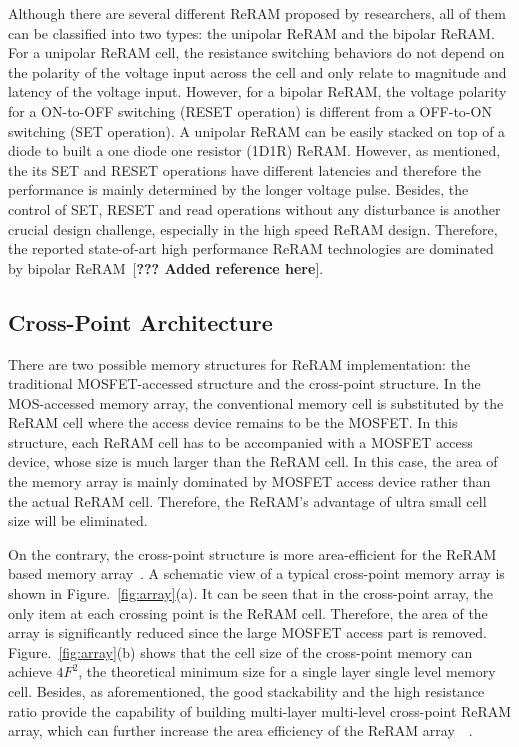 Although there are several different ReRAM proposed by researchers, all of them can be classified into two types: the unipolar ReRAM and the bipolar ReRAM. For a unipolar ReRAM cell, the resistance switching behaviors do not depend on the polarity of the voltage input across the cell and only relate to magnitude and latency of the voltage input. However, for a bipolar ReRAM, the voltage polarity for a ON-to-OFF switching (RESET operation) is different from a OFF-to-ON switching (SET operation). A unipolar ReRAM can be easily stacked on top of a diode to built a one diode one resistor (1D1R) ReRAM. However, as mentioned, the its SET and RESET operations have different latencies and therefore the performance is mainly determined by the longer voltage pulse. Besides, the control of SET, RESET and read operations without any disturbance is another crucial design challenge, especially in the high speed ReRAM design. Therefore, the reported state-of-art high performance ReRAM technologies are dominated by bipolar ReRAM~[\textbf{??? Added reference here}].

\subsection{Cross-Point Architecture}
There are two possible memory structures for ReRAM implementation: the traditional MOSFET-accessed structure and the cross-point structure. In the MOS-accessed memory array, the conventional memory cell is substituted by the ReRAM cell where the access device remains to be the MOSFET. In this structure, each ReRAM cell has to be accompanied with a MOSFET access device, whose size is much larger than the ReRAM cell. In this case, the area of the memory array is mainly dominated by MOSFET access device rather than the actual ReRAM cell. Therefore, the ReRAM's advantage of ultra small cell size will be eliminated.

On the contrary, the cross-point structure is more area-efficient for the ReRAM based memory array~\cite{memristor:Cong}. A schematic view of a typical cross-point memory array is shown in Figure.~\ref{fig:array}(a). It can be seen that in the cross-point array, the only item at each crossing point is the ReRAM cell. Therefore, the area of the array is significantly reduced since the large MOSFET access part is removed. Figure.~\ref{fig:array}(b) shows that the cell size of the cross-point memory can achieve $4F^2$, the theoretical minimum size for a single layer single level memory cell. Besides, as aforementioned, the good stackability and the high resistance ratio provide the capability of building multi-layer multi-level cross-point ReRAM array, which can further increase the area efficiency of the ReRAM array~\cite{memristor:ISSCC2011_ITRI}~\cite{memristor:IEDM08_3D}.

